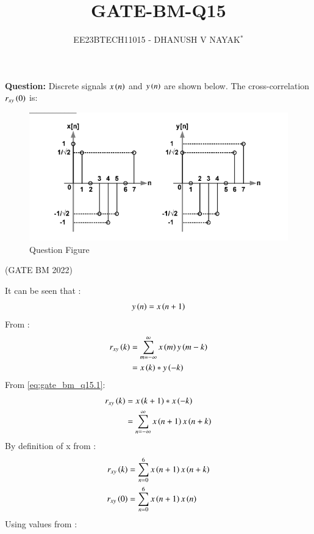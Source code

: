 \documentclass[journal,12pt,twocolumn]{IEEEtran}
\theoremstyle{remark}
\begin{document}

\title{GATE-BM-Q15}
\author{EE23BTECH11015 - DHANUSH V NAYAK$^{*}$%
}
\maketitle
\newpage
\bigskip
\renewcommand{\thefigure}{\arabic{figure}}
\renewcommand{\thetable}{\theenumi}
\textbf{Question:} Discrete signals $x\left(n\right)$ and $y\left(n\right)$ are shown below. The cross-correlation $r_{xy}\left(0\right)$ is:
\begin{figure}[H]
    \includegraphics[width=1\columnwidth]{figs/question_BM_15.png}
    \caption{Question Figure}
    \label{fig:question_fig}
\end{figure}\hfill{(GATE BM 2022)}\\
\solution

It can be seen that :
\begin{align}
    y\left(n\right) = x\left(n+1\right)\label{eq:gate_bm_q15.1}
\end{align}
From  :
\begin{align}
    r_{xy}\left(k\right) &= \sum_{m=-\infty}^{\infty} x\left(m\right)y\left(m-k\right)\\
                &= x\left(k\right) * y\left(-k\right)
\end{align}
From \eqref{eq:gate_bm_q15.1}:
\begin{align}
    r_{xy}\left(k\right) &= x\left(k+1\right) * x\left(-k\right)\\
                &= \sum_{n=-\infty}^{\infty} x\left(n+1\right)x\left(n+k\right) 
\end{align}
By definition of x from :
\begin{align}
     r_{xy}\left(k\right) &= \sum_{n=0}^{6} x\left(n+1\right)x\left(n+k\right) \\
     r_{xy}\left(0\right) &= \sum_{n=0}^{6} x\left(n+1\right)x\left(n\right) 
\end{align}
Using values from :
\end{document}
